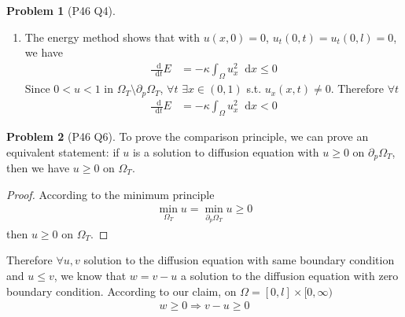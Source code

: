 \documentclass[twoside,11pt]{article}
\renewcommand*\d{\mathop{}\!\mathrm{d}}
\theoremstyle{definition}
\newtheorem{problem}{Problem}
\theoremstyle{remark}
\begin{document}
\begin{problem}[P46 Q4]
\begin{enumerate}
        \item The energy method shows that with $u(x, 0)=0$, $u_t(0, t)=u_t(0, l)=0$, we have
        \begin{align*}
            \frac{\d }{\d t}E &= -\kappa\int_\Omega  u_x^2\d x \leq 0
        \end{align*}
        Since $0 < u < 1$ in $\Omega_T\setminus\partial_p\Omega_T$,
        $\forall t$ $\exists x\in(0, 1)$ s.t. $u_x(x, t)\neq 0$.
        Therefore $\forall t$
        \begin{align*}
            \frac{\d }{\d t}E &= -\kappa\int_\Omega  u_x^2\d x <0
        \end{align*}
    \end{enumerate}
\end{problem}

\begin{problem}[P46 Q6]
To prove the comparison principle, we can prove an equivalent statement:
if $u$ is a solution to diffusion equation with $u\geq 0$ on $\partial_p\Omega_T$, then 
we have $u\geq 0$ on $\Omega_T$.
\begin{proof}
    According to the minimum principle
    \begin{align*}
        \min_{\Omega_T} u = \min_{\partial_p\Omega_T} u\geq 0
    \end{align*}
    then $u\geq 0$ on $\Omega_T$.
\end{proof}
Therefore $\forall u, v$ solution to the diffusion equation with same boundary condition and $u\leq v$,
we know that $w=v-u$ a solution to the diffusion equation with zero boundary condition.
According to our claim, on $\Omega=[0,l]\times [0, \infty)$
\begin{align*}
    w \geq 0 \Rightarrow v - u \geq 0
\end{align*}
\end{problem}
\end{document}
